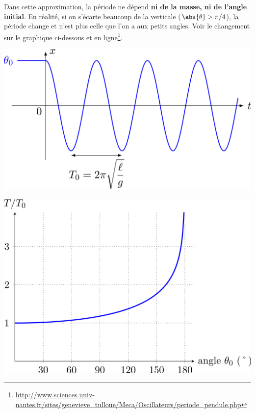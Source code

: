 \documentclass[../../main/main.tex]{subfiles}
\begin{document}
Dans cette approximation, la période ne dépend \textbf{ni de la masse, ni de
l'angle initial}. En réalité, si on s'écarte beaucoup de la verticale
($\abs{\theta} > \pi/4$), la période change et n'est plus celle que l'on a aux
petits angles. Voir le changement sur le graphique ci-dessous et en
ligne\footnote{\url{http://www.sciences.univ-nantes.fr/sites/genevieve_tulloue/Meca/Oscillateurs/periode_pendule.php}}.

\begin{minipage}{0.45\linewidth}
	\begin{center}
		\includegraphics[width=\linewidth]{pendule_sol}
	\end{center}
\end{minipage}
\hfill
\begin{minipage}{0.45\linewidth}
	\begin{center}
		\includegraphics[width=\linewidth]{pendule_gdang}
	\end{center}
\end{minipage}
\end{document}
